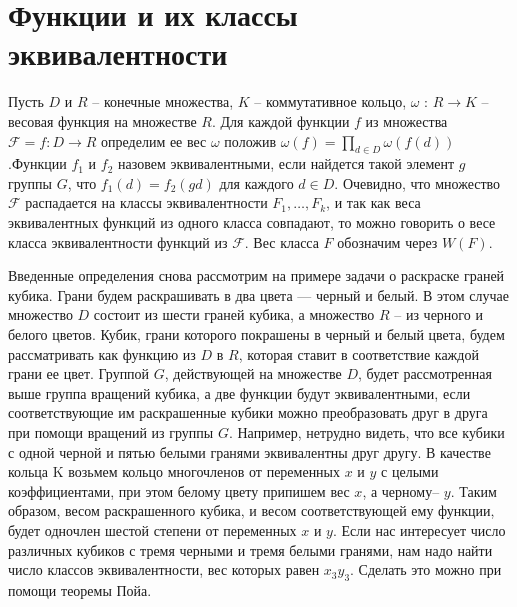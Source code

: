 \documentclass[12pt]{article}
\numberwithin{equation}{section}
\begin{document}
	 \tableofcontents 
	\newpage
	\section{Функции и их классы эквивалентности}
	Пусть $D$ и $R$ -- конечные множества, $K$ -- коммутативное кольцо, $\omega$ : $R \rightarrow K$ -- весовая функция на множестве $R$. Для каждой функции $f$ из множества $\mathcal{F} = {f : D \rightarrow R}$ определим ее вес $ \omega $ положив $\omega(f)= \prod_{d\in D} \omega\left( f(d)\right)  $.Функции $f_{1}$ и $f_{2}$ назовем эквивалентными, если найдется такой элемент $g$ группы $G$, что $f_{1}(d) = f_{2}(gd)$ для каждого $d \in D.$ Очевидно, что множество $\mathcal{F}$ распадается на классы эквивалентности $F_{1},\ldots,F_{k}$, и так как веса эквивалентных функций из одного класса совпадают, то можно говорить о весе класса эквивалентности функций из $\mathcal{F}$. Вес класса $F$ обозначим через $W(F)$.
	
	Введенные определения снова рассмотрим на примере задачи о раскраске граней кубика. Грани будем раскрашивать в два цвета — черный и белый. В этом случае множество $D$ состоит из шести граней кубика, а множество $R$ -- из черного и белого цветов. Кубик, грани которого покрашены в черный и белый цвета, будем рассматривать как функцию из $D$ в $R$, которая ставит в соответствие каждой грани ее цвет. Группой $G$, действующей на множестве $D$, будет рассмотренная выше группа вращений кубика, а две функции будут эквивалентными, если соответствующие им раскрашенные кубики можно преобразовать друг в друга при помощи вращений из группы $G$. Например, нетрудно видеть, что все кубики с одной черной и пятью белыми гранями эквивалентны друг другу. В качестве кольца K возьмем кольцо многочленов от переменных $x$ и $y$ с целыми коэффициентами, при этом белому цвету припишем вес $x$, а черному-- $y$. Таким образом, весом раскрашенного кубика, и весом соответствующей ему функции, будет одночлен шестой степени от переменных $x$ и $y$. Если нас интересует число различных кубиков с тремя черными и тремя белыми гранями, нам надо найти число классов эквивалентности, вес которых равен $x_{3}y_{3}$. Сделать это можно при помощи теоремы Пойа.
\end{document}
